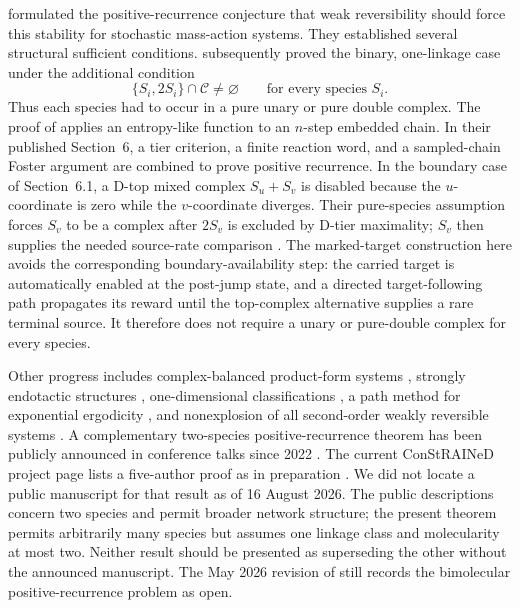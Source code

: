 \citet{AndersonKim2018} formulated the positive-recurrence conjecture that
weak reversibility should force this stability for stochastic mass-action
systems.  They established several structural sufficient conditions.
\citet{AndersonCappellettiKim2020} subsequently proved the binary,
one-linkage case under the additional condition
\begin{equation}\label{eq:ACK-condition}
  \{S_i,2S_i\}\cap\mathcal C\ne\varnothing
  \qquad\text{for every species }S_i.
\end{equation}
Thus each species had to occur in a pure unary or pure double complex.  The
proof of \citet{AndersonCappellettiKim2020} applies an entropy-like function
to an \(n\)-step embedded chain.  In their published Section~6, a tier
criterion, a finite reaction word, and a sampled-chain Foster argument are
combined to prove positive recurrence.  In the boundary case of
Section~6.1, a D-top mixed complex \(S_u+S_v\) is disabled because the
\(u\)-coordinate is zero while the \(v\)-coordinate diverges.  Their
pure-species assumption forces \(S_v\) to be a complex after \(2S_v\) is
excluded by D-tier maximality; \(S_v\) then supplies the needed source-rate
comparison \citep[Section~6, especially Section~6.1]{AndersonCappellettiKim2020}.
The marked-target construction here avoids the corresponding
boundary-availability step: the carried target is automatically enabled at
the post-jump state, and a directed target-following path propagates its
reward until the top-complex alternative supplies a rare terminal source.  It
therefore does not require a unary or pure-double complex for every species.

Other progress includes complex-balanced product-form systems
\citep{AndersonCraciunKurtz2010}, strongly endotactic structures
\citep{AndersonCappellettiKimNguyen2020}, one-dimensional classifications
\citep{WiufXu2023}, a path method for exponential ergodicity
\citep{AndersonCappellettiFanKim2025}, and nonexplosion of all second-order
weakly reversible systems \citep{Xu2026}.  A complementary two-species
positive-recurrence theorem has been publicly announced in conference talks
since 2022 \citep{Agazzi2022Talk,Agazzi2025Talk}.  The current ConStRAINeD
project page lists a five-author proof as in preparation
\citep{ConStRAINeDResults}.  We did not locate a public manuscript for that
result as of 16 August 2026.  The public descriptions concern two species and
permit broader network structure; the present theorem permits arbitrarily many
species but assumes one linkage class and molecularity at most two.  Neither
result should be presented as superseding the other without the announced
manuscript.  The May 2026
revision of \citet{Xu2026} still records the bimolecular positive-recurrence
problem as open.

